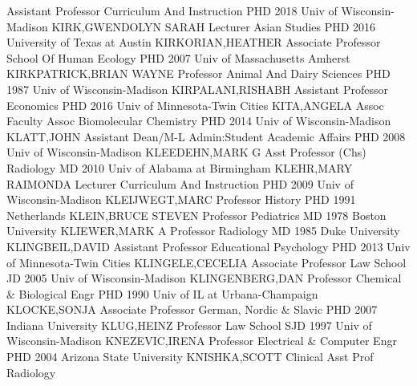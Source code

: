 \documentclass[
]{article}
\begin{document}
\textbar Assistant Professor \textbar Curriculum And Instruction
\textbar PHD 2018 Univ of Wisconsin-Madison \textbar KIRK,GWENDOLYN
SARAH \textbar{}  \textbar Lecturer \textbar Asian Studies
\textbar PHD 2016 University of Texas at Austin
\textbar KIRKORIAN,HEATHER \textbar{}  \textbar Associate
Professor \textbar School Of Human Ecology \textbar PHD 2007 Univ of
Massachusetts Amherst \textbar KIRKPATRICK,BRIAN WAYNE \textbar{}
 \textbar Professor \textbar Animal And Dairy Sciences
\textbar PHD 1987 Univ of Wisconsin-Madison \textbar KIRPALANI,RISHABH
\textbar{}  \textbar Assistant Professor \textbar Economics
\textbar PHD 2016 Univ of Minnesota-Twin Cities \textbar KITA,ANGELA
\textbar{}  \textbar Assoc Faculty Assoc
\textbar Biomolecular Chemistry \textbar PHD 2014 Univ of
Wisconsin-Madison \textbar KLATT,JOHN \textbar{} 
\textbar Assistant Dean/M-L \textbar Admin:Student Academic Affairs
\textbar PHD 2008 Univ of Wisconsin-Madison \textbar KLEEDEHN,MARK G
\textbar{}  \textbar Asst Professor (Chs) \textbar Radiology
\textbar MD 2010 Univ of Alabama at Birmingham \textbar KLEHR,MARY
RAIMONDA \textbar{}  \textbar Lecturer \textbar Curriculum
And Instruction \textbar PHD 2009 Univ of Wisconsin-Madison
\textbar KLEIJWEGT,MARC \textbar{}  \textbar Professor
\textbar History \textbar PHD 1991 Netherlands \textbar KLEIN,BRUCE
STEVEN \textbar{}  \textbar Professor \textbar Pediatrics
\textbar MD 1978 Boston University \textbar KLIEWER,MARK A \textbar{}
 \textbar Professor \textbar Radiology \textbar MD 1985 Duke
University \textbar KLINGBEIL,DAVID \textbar{} 
\textbar Assistant Professor \textbar Educational Psychology
\textbar PHD 2013 Univ of Minnesota-Twin Cities
\textbar KLINGELE,CECELIA \textbar{}  \textbar Associate
Professor \textbar Law School \textbar JD 2005 Univ of Wisconsin-Madison
\textbar KLINGENBERG,DAN \textbar{}  \textbar Professor
\textbar Chemical \& Biological Engr \textbar PHD 1990 Univ of IL at
Urbana-Champaign \textbar KLOCKE,SONJA \textbar{} 
\textbar Associate Professor \textbar German, Nordic \& Slavic
\textbar PHD 2007 Indiana University \textbar KLUG,HEINZ \textbar{}
 \textbar Professor \textbar Law School \textbar SJD 1997
Univ of Wisconsin-Madison \textbar KNEZEVIC,IRENA \textbar{}
 \textbar Professor \textbar Electrical \& Computer Engr
\textbar PHD 2004 Arizona State University \textbar KNISHKA,SCOTT
\textbar{}  \textbar Clinical Asst Prof \textbar Radiology
\end{document}
